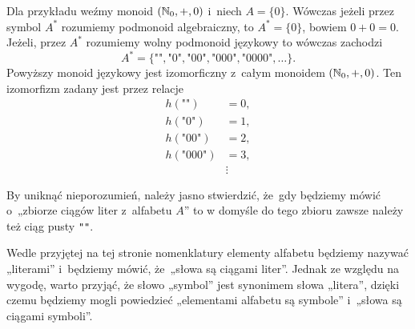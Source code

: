\documentclass[a4paper,11pt]{article}
\begin{document}
Dla przykładu weźmy monoid $( \mathbb{N}_{ 0 }, +, 0)$ i~niech $A = \{ 0 \}$. Wówczas
jeżeli przez symbol $A^{ * }$ rozumiemy podmonoid algebraiczny, to $A^{ * } =
\{ 0 \}$, bowiem $0 + 0 = 0$. Jeżeli, przez $A^{ * }$ rozumiemy wolny podmonoid
językowy to wówczas zachodzi
\begin{equation}
  \label{eq:Forys-Forys-09}
  A^{ * } = \{ \texttt{""}, \texttt{"} 0 \texttt{"},
  \texttt{"} 00 \texttt{"}, \texttt{"} 000 \texttt{"},
  \texttt{"} 0000 \texttt{"}, \ldots \}.
\end{equation}
Powyższy monoid językowy jest izomorficzny z~całym monoidem
$( \mathbb{N}_{ 0 }, +, 0)$. Ten izomorfizm zadany jest przez relacje
\begin{equation}
  \label{eq:Forys-Forys-10}
  \begin{split}
    h( \texttt{""} ) &= 0, \\
    h( \texttt{"} 0 \texttt{"} ) &= 1, \\
    h( \texttt{"} 0 0 \texttt{"} ) &= 2, \\
    h( \texttt{"} 0 0 0 \texttt{"} ) &= 3, \\
                     &\vdots
  \end{split}
\end{equation}

\vspace{\spaceFour}





\start {} By uniknąć nieporozumień, należy jasno stwierdzić, że~gdy
będziemy mówić o~„zbiorze ciągów liter z~alfabetu $A$” to w domyśle do tego
zbioru zawsze należy też ciąg pusty \texttt{""}.

\vspace{\spaceFour}





\start {} Wedle przyjętej na tej stronie nomenklatury elementy
alfabetu będziemy nazywać „literami” i~będziemy mówić, że~„słowa są
ciągami liter”. Jednak ze względu na wygodę, warto przyjąć, że słowo
„symbol” jest synonimem słowa „litera”, dzięki czemu będziemy mogli
powiedzieć „elementami alfabetu są symbole” i~„słowa są ciągami
symboli”.

\vspace{\spaceFour}
\end{document}
